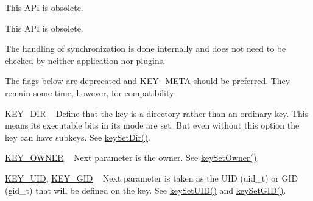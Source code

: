 \begin{DoxyRefList}
%
This A\+PI is obsolete. 
\item[Member \mbox{\hyperlink{group__meta_gacaa5060e67b03f50ae49a3620c54bc46}{key\+Get\+U\+ID}} (const \mbox{\hyperlink{classkdb_1_1Key}{Key}} $\ast$key)]\label{deprecated__deprecated000014}%
%
This A\+PI is obsolete. 
\item[Member \mbox{\hyperlink{group__keytest_gaf247df0de7aca04b32ef80e39ef12950}{key\+Need\+Sync}} (const \mbox{\hyperlink{classkdb_1_1Key}{Key}} $\ast$key)]\label{deprecated__deprecated000012}%
%
The handling of synchronization is done internally and does not need to be checked by neither application nor plugins. 
\item[Member \mbox{\hyperlink{group__key_gad23c65b44bf48d773759e1f9a4d43b89}{key\+New}} (const char $\ast$name,...)]\label{deprecated__deprecated000010}%
%
The flags below are deprecated and \mbox{\hyperlink{group__key_gga91fb3178848bd682000958089abbaf40a040582834bb2d90049947d7ef74e87e2}{K\+E\+Y\+\_\+\+M\+E\+TA}} should be preferred. They remain some time, however, for compatibility\+:
\begin{DoxyItemize}
\item \mbox{\hyperlink{group__key_gga91fb3178848bd682000958089abbaf40a9e43e47c8a21478538e2d20e049981d5}{K\+E\+Y\+\_\+\+D\+IR}} ~\newline
 Define that the key is a directory rather than an ordinary key. This means its executable bits in its mode are set. But even without this option the key can have subkeys. See \mbox{\hyperlink{group__meta_gaae575bd86a628a15ee45baa860522e75}{key\+Set\+Dir()}}.
\item \mbox{\hyperlink{group__key_gga91fb3178848bd682000958089abbaf40a77ca60362fa8daca8d5347db4385068b}{K\+E\+Y\+\_\+\+O\+W\+N\+ER}} ~\newline
 Next parameter is the owner. See \mbox{\hyperlink{owner_8c_a88d6ec200ba0707b7c1b4a88133d2be4}{key\+Set\+Owner()}}.
\item \mbox{\hyperlink{group__key_gga91fb3178848bd682000958089abbaf40a28f01a87d65f065172f734c9c9446c0e}{K\+E\+Y\+\_\+\+U\+ID}}, \mbox{\hyperlink{group__key_gga91fb3178848bd682000958089abbaf40ac0628bbaba7c837ca73323681393d15f}{K\+E\+Y\+\_\+\+G\+ID}} ~\newline
 Next parameter is taken as the U\+ID (uid\+\_\+t) or G\+ID (gid\+\_\+t) that will be defined on the key. See \mbox{\hyperlink{group__meta_gab5f284f5ecd261e0a290095f50ba1af7}{key\+Set\+U\+I\+D()}} and \mbox{\hyperlink{group__meta_ga9e3d0fb3f7ba906e067727b9155d22e3}{key\+Set\+G\+I\+D()}}.

\end{DoxyItemize}
\end{DoxyRefList}
